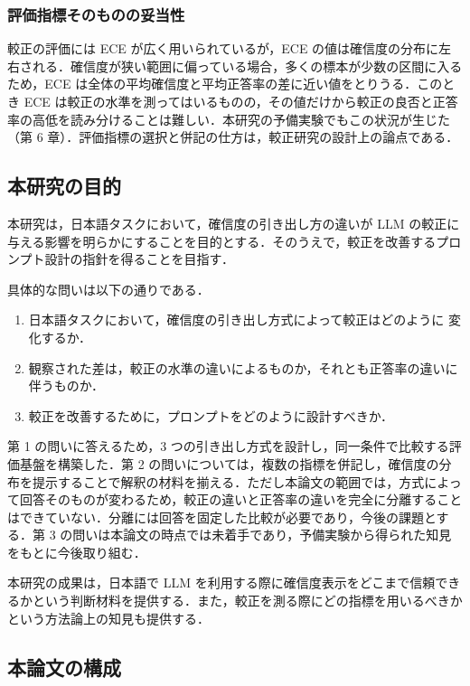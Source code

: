 \subsubsection{評価指標そのものの妥当性}

較正の評価には ECE が広く用いられているが，ECE の値は確信度の分布に左右される．確信度が狭い範囲に偏っている場合，多くの標本が少数の区間に入るため，ECE は全体の平均確信度と平均正答率の差に近い値をとりうる．このとき ECE は較正の水準を測ってはいるものの，その値だけから較正の良否と正答率の高低を読み分けることは難しい．本研究の予備実験でもこの状況が生じた（第 6 章）．評価指標の選択と併記の仕方は，較正研究の設計上の論点である．

\subsection{本研究の目的}

本研究は，日本語タスクにおいて，確信度の引き出し方の違いが LLM の較正に与える影響を明らかにすることを目的とする．そのうえで，較正を改善するプロンプト設計の指針を得ることを目指す．

具体的な問いは以下の通りである．

\begin{enumerate}
\item 日本語タスクにおいて，確信度の引き出し方式によって較正はどのように
変化するか．

\item 観察された差は，較正の水準の違いによるものか，それとも正答率の違いに
伴うものか．

\item 較正を改善するために，プロンプトをどのように設計すべきか．
\end{enumerate}

第 1 の問いに答えるため，3 つの引き出し方式を設計し，同一条件で比較する評価基盤を構築した．第 2 の問いについては，複数の指標を併記し，確信度の分布を提示することで解釈の材料を揃える．ただし本論文の範囲では，方式によって回答そのものが変わるため，較正の違いと正答率の違いを完全に分離することはできていない．分離には回答を固定した比較が必要であり，今後の課題とする．第 3 の問いは本論文の時点では未着手であり，予備実験から得られた知見をもとに今後取り組む．

本研究の成果は，日本語で LLM を利用する際に確信度表示をどこまで信頼できるかという判断材料を提供する．また，較正を測る際にどの指標を用いるべきかという方法論上の知見も提供する．

\subsection{本論文の構成}

